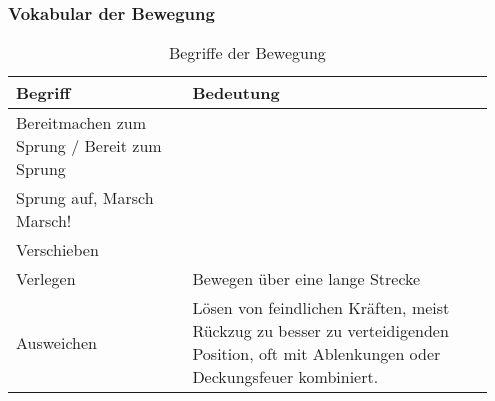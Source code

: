 \subsubsection{Vokabular der Bewegung}
	\begin{longtable}{|p{0.35\linewidth} | p{0.6\linewidth} |}
		\caption[Vokabular Bewegung]{Begriffe der Bewegung} \\
		\hline
		\textbf{Begriff} & \textbf{Bedeutung} \\
		\hline
		Bereitmachen zum Sprung / Bereit zum Sprung & \\
		\hline
		Sprung auf, Marsch Marsch! & \\
		\hline
		Verschieben & \\
		\hline
		Verlegen & Bewegen über eine lange Strecke \\
		\hline
		Ausweichen & Lösen von feindlichen Kräften, meist Rückzug zu besser zu verteidigenden Position, oft mit Ablenkungen oder Deckungsfeuer kombiniert.\\
		\hline
	\end{longtable}